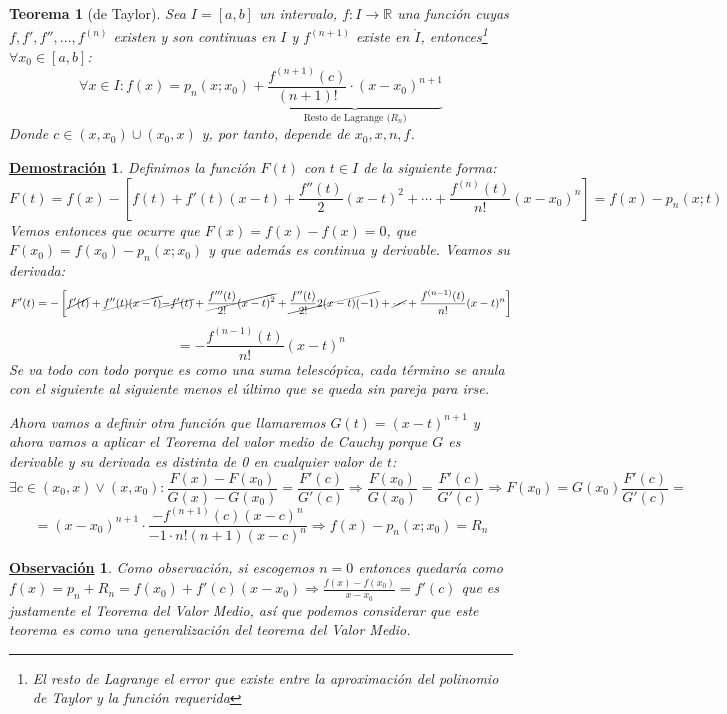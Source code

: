 \documentclass[10pt,a4paper,openright]{book}
\theoremstyle{break}
\newtheorem{theo}{Teorema}[chapter]
\newtheorem*{demo}{\underline{Demostración}}
\newtheorem{obs}{\underline{Observación}}[chapter]
\begin{document}
\begin{theo}[de Taylor]
Sea $I=[a,b]$ un intervalo, $f:I\rightarrow \mathbb R$ una función cuyas $f,f',f'', ..., f^{(n)}$ existen y son continuas en $I$ y $f^{(n+1)}$ existe en $\mathring{I}$, entonces\footnote{El resto de Lagrange el error que existe entre la aproximación del polinomio de Taylor y la función requerida} $\forall x_0 \in [a,b]$:
$$\forall x\in I: f(x)=p_n(x; x_0)+\underbrace{\frac{f^{(n+1)}(c)}{(n+1)!}\cdot (x-x_0)^{n+1}}_{\text{Resto de Lagrange ($R_n$)}}$$
Donde $c\in (x,x_0)\cup (x_0, x)$ y, por tanto, depende de $x_0, x, n, f$.
\end{theo}
\begin{demo}
Definimos la función $F(t)$ con $t\in I$ de la siguiente forma:
$$F(t)=f(x)-\left[f(t)+f'(t)(x-t)+\frac{f''(t)}{2}(x-t)^2+\cdots + \frac{f^{(n)}(t)}{n!}(x-x_0)^n\right]=f(x)-p_n(x;t)$$
Vemos entonces que ocurre que $F(x)=f(x)-f(x)=0$, que $F(x_0)=f(x_0)-p_n(x;x_0)$ y que además es continua y derivable. Veamos su derivada:
$$F'(t)=-\left[\cancel{f'(t)}+\cancel{f''(t)(x-t)}\cancel{-f'(t)}+\cancel{\frac{f'''(t)}{2!}(x-t)^2}+\cancel{\frac{f''(t)}{2!}2(x-t)(-1)}+\cancel{\cdots} +  \frac{f^{(n-1)}(t)}{n!}(x-t)^n\right] $$
$$= -\frac{f^{(n-1)}(t)}{n!}(x-t)^n$$
Se va todo con todo porque es como una suma telescópica, cada término se anula con el siguiente al siguiente menos el último que se queda sin pareja para irse.

Ahora vamos a definir otra función que llamaremos $G(t)=(x-t)^{n+1}$ y ahora vamos a aplicar el Teorema del valor medio de Cauchy porque $G$ es derivable y su derivada es distinta de 0 en cualquier valor de $t$:
$$\exists c \in (x_0,x)\vee (x,x_0): \frac{F(x)-F(x_0)}{G(x)-G(x_0)}=\frac{F'(c)}{G'(c)}\Rightarrow \frac{F(x_0)}{G(x_0)}=\frac{F'(c)}{G'(c)}\Rightarrow F(x_0)=G(x_0)\frac{F'(c)}{G'(c)}=$$
$$=(x-x_0)^{n+1}\cdot \frac{-f^{(n+1)}(c)(x-c)^n}{-1\cdot n!(n+1)(x-c)^n}\Rightarrow f(x)-p_n(x;x_0)=R_n$$
\end{demo}

\begin{obs}
Como observación, si escogemos $n=0$ entonces quedaría como $f(x)=p_n+R_n=f(x_0)+f'(c)(x-x_0)\Rightarrow \frac{f(x)-f(x_0)}{x-x_0}=f'(c)$ que es justamente el Teorema del Valor Medio, así que podemos considerar que este teorema es como una generalización del teorema del Valor Medio.
\end{obs}
\end{document}
